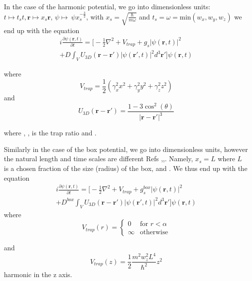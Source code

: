 \documentclass[10pt]{article}
\numberwithin{equation}{section}
\begin{document}
\begin{multicols}{2}
In the case of the harmonic potential, we go into dimensionless units: $t \mapsto t_s t, \textbf{r} \mapsto x_s\textbf{r}$, $\psi \mapsto \ \psi x_{s}^{-\frac{3}{2}}$, with $x_{s}=\sqrt{\frac{\hbar}{m\omega}}$ and $t_s=\omega = \text{min}(w_x,w_y,w_z)$ we end up with the equation
\begin{multline}
i\frac{\partial \psi(\textbf{r},t)}{\partial t}=\bigg[-\frac{1}{2}\nabla^2 + V_{trap} + g_{s}|\psi(\textbf{r},t)|^2 \\+ D \int_V U_{3D}(\textbf{r}-\textbf{r}')|\psi(\textbf{r}',t)|^2 d^3\textbf{r}' \bigg]\psi(\textbf{r},t)
\end{multline}

where
\begin{equation}
V_{trap}=\frac{1}{2}(\gamma_{x}^2 x^2+\gamma_{y}^2 y^2+\gamma_{z}^2 z^2)
\end{equation}
and
\begin{equation}
U_{3D}(\textbf{r}-\textbf{r}')=\frac{1-3 \cos^2{(\theta)}}{|\textbf{r}-\textbf{r}'|^3}
\end{equation}

where , , is the trap ratio and .

Similarly in the case of the box potential, we go into dimensionless units, however the natural length and time scales are different Refs \cite{Bao_2013},\cite{Galati_2013},\cite{Oganesov_2018}. Namely, $x_s=L$ where $L$ is a chosen fraction of the size (radius) of the box, and . We thus end up with the equation
\begin{multline}
i\frac{\partial \psi(\textbf{r},t)}{\partial t}=\bigg[-\frac{1}{2}\nabla^2 + V_{trap} + g_{s}^{box}|\psi(\textbf{r},t)|^2 \\+ D^{box} \int_V U_{3D}(\textbf{r}-\textbf{r}')|\psi(\textbf{r}',t)|^2 d^3\textbf{r}' \bigg]\psi(\textbf{r},t)
\end{multline}
where
\begin{equation*}
V_{trap}(r) = 
\begin{cases}
0 & \text{for $r<\alpha$} \\
\infty & \text{otherwise}
\end{cases}
\end{equation*}

and
\begin{equation}
V_{trap}(z)=\frac{1}{2} \frac{m^2w_{z}^2 L^4}{\hbar^2}z^2 \label{Vextbox}
\end{equation}
 harmonic in the z axis.


\end{multicols}
\end{document}
